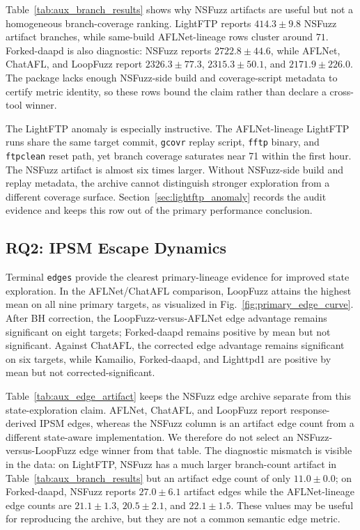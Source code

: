 \documentclass[final,5p,times,number]{elsarticle}
\begin{document}
Table~\ref{tab:aux_branch_results} shows why NSFuzz artifacts are useful but not a homogeneous branch-coverage ranking. LightFTP reports $414.3{\pm}9.8$ NSFuzz artifact branches, while same-build AFLNet-lineage rows cluster around $71$. Forked-daapd is also diagnostic: NSFuzz reports $2722.8{\pm}44.6$, while AFLNet, ChatAFL, and LoopFuzz report $2326.3{\pm}77.3$, $2315.3{\pm}50.1$, and $2171.9{\pm}226.0$. The package lacks enough NSFuzz-side build and coverage-script metadata to certify metric identity, so these rows bound the claim rather than declare a cross-tool winner.

The LightFTP anomaly is especially instructive. The AFLNet-lineage LightFTP runs share the same target commit, \texttt{gcovr} replay script, \texttt{fftp} binary, and \texttt{ftpclean} reset path, yet branch coverage saturates near 71 within the first hour. The NSFuzz artifact is almost six times larger. Without NSFuzz-side build and replay metadata, the archive cannot distinguish stronger exploration from a different coverage surface. Section~\ref{sec:lightftp_anomaly} records the audit evidence and keeps this row out of the primary performance conclusion.

\subsection{RQ2: IPSM Escape Dynamics}

Terminal \texttt{edges} provide the clearest primary-lineage evidence for improved state exploration. In the AFLNet/ChatAFL comparison, LoopFuzz attains the highest mean on all nine primary targets, as visualized in Fig.~\ref{fig:primary_edge_curve}. After BH correction, the LoopFuzz-versus-AFLNet edge advantage remains significant on eight targets; Forked-daapd remains positive by mean but not significant. Against ChatAFL, the corrected edge advantage remains significant on six targets, while Kamailio, Forked-daapd, and Lighttpd1 are positive by mean but not corrected-significant.

Table~\ref{tab:aux_edge_artifact} keeps the NSFuzz edge archive separate from this state-exploration claim. AFLNet, ChatAFL, and LoopFuzz report response-derived IPSM edges, whereas the NSFuzz column is an artifact edge count from a different state-aware implementation. We therefore do not select an NSFuzz-versus-LoopFuzz edge winner from that table. The diagnostic mismatch is visible in the data: on LightFTP, NSFuzz has a much larger branch-count artifact in Table~\ref{tab:aux_branch_results} but an artifact edge count of only $11.0{\pm}0.0$; on Forked-daapd, NSFuzz reports $27.0{\pm}6.1$ artifact edges while the AFLNet-lineage edge counts are $21.1{\pm}1.3$, $20.5{\pm}2.1$, and $22.1{\pm}1.5$. These values may be useful for reproducing the archive, but they are not a common semantic edge metric.
\end{document}
